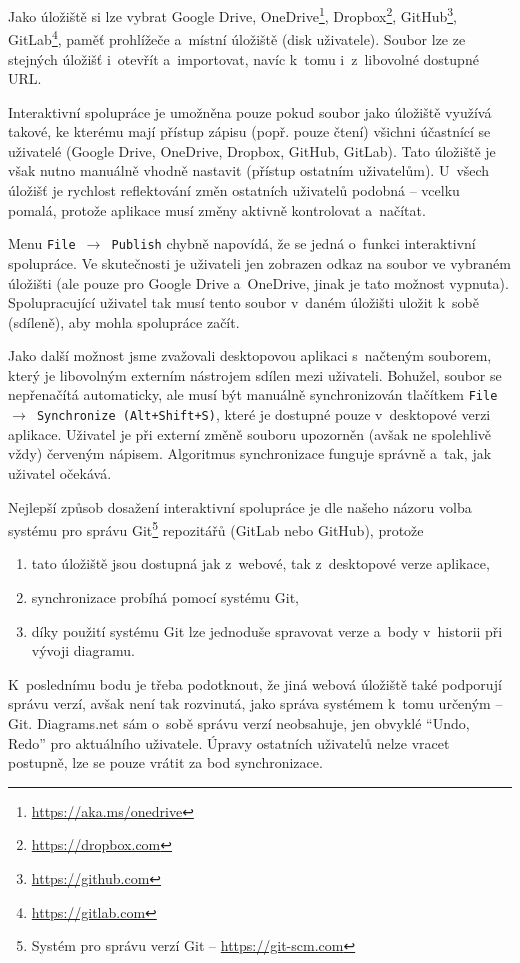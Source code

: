 Jako úložiště si lze vybrat Google Drive,
OneDrive\footnote{\url{https://aka.ms/onedrive}},
Dropbox\footnote{\url{https://dropbox.com}},
GitHub\footnote{\url{https://github.com}},
GitLab\footnote{\url{https://gitlab.com}}, paměť prohlížeče a~místní úložiště
(disk uživatele). Soubor lze ze stejných úložišť i~otevřít a~importovat, navíc
k~tomu i~z~libovolné dostupné URL.

Interaktivní spolupráce je umožněna pouze pokud soubor jako úložiště využívá
takové, ke kterému mají přístup zápisu (popř. pouze čtení) všichni účastnící se
uživatelé (Google Drive, OneDrive, Dropbox, GitHub, GitLab). Tato úložiště je
však nutno manuálně vhodně nastavit (přístup ostatním uživatelům). U~všech
úložišť je rychlost reflektování změn ostatních uživatelů podobná -- vcelku
pomalá, protože aplikace musí změny aktivně kontrolovat a~načítat.

Menu \texttt{File $\rightarrow$ Publish} chybně napovídá, že se jedná o~funkci
interaktivní spolupráce. Ve skutečnosti je uživateli jen zobrazen odkaz na
soubor ve vybraném úložišti (ale pouze pro Google Drive a~OneDrive, jinak je
tato možnost vypnuta). Spolupracující uživatel tak musí tento soubor v~daném
úložišti uložit k~sobě (sdíleně), aby mohla spolupráce začít.

Jako další možnost jsme zvažovali desktopovou aplikaci s~načteným souborem,
který je libovolným externím nástrojem sdílen mezi uživateli. Bohužel, soubor se
nepřenačítá automaticky, ale musí být manuálně synchronizován tlačítkem
\texttt{File $\rightarrow$ Synchronize (Alt+Shift+S)}, které je dostupné pouze
v~desktopové verzi aplikace. Uživatel je při externí změně souboru upozorněn
(avšak ne spolehlivě vždy) červeným nápisem. Algoritmus synchronizace funguje
správně a~tak, jak uživatel očekává.

Nejlepší způsob dosažení interaktivní spolupráce je dle našeho názoru volba
systému pro správu Git\footnote{Systém pro správu verzí Git --
\url{https://git-scm.com}} repozitářů (GitLab nebo GitHub), protože
\begin{enumerate}
  \item tato úložiště jsou dostupná jak z~webové, tak z~desktopové verze
  aplikace,
  \item synchronizace probíhá pomocí systému Git,
  \item díky použití systému Git lze jednoduše spravovat verze a~body v~historii
  při vývoji diagramu.
\end{enumerate}

K~poslednímu bodu je třeba podotknout, že jiná webová úložiště také podporují
správu verzí, avšak není tak rozvinutá, jako správa systémem k~tomu určeným --
Git. Diagrams.net sám o~sobě správu verzí neobsahuje, jen obvyklé ``Undo, Redo''
pro aktuálního uživatele. Úpravy ostatních uživatelů nelze vracet postupně, lze
se pouze vrátit za bod synchronizace.

